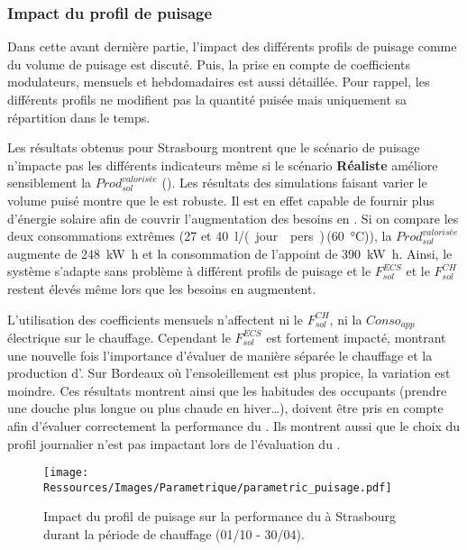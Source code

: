 \subsubsection{Impact du profil de puisage} %
\label{ssub:impact_du_profil_de_puisage}
Dans cette avant dernière partie, l’impact des différents profils de puisage comme du
volume de puisage est discuté. Puis, la prise en compte de coefficients modulateurs,
mensuels et hebdomadaires est aussi détaillée. Pour rappel, les différents profils ne
modifient pas la quantité puisée mais uniquement sa répartition dans le temps.

Les résultats obtenus pour Strasbourg montrent que le scénario de puisage n’impacte pas
les différents indicateurs même si le scénario \textbf{Réaliste} améliore sensiblement la
$Prod_{sol}^{valorisée}$ (). Les résultats des
simulations faisant varier le volume puisé montre que le  est robuste. Il est en
effet capable de fournir plus d’énergie solaire afin de couvrir l’augmentation des besoins
en . Si on compare les deux consommations extrêmes (\num{27} et
\SI{40}{\litre/(jour\period pers)}\,(\SI{60}{\celsius})), la $Prod_{sol}^{valorisée}$
augmente de \SI{248}{\kilo\watt\hour} et la consommation de l’appoint de \SI{390}{\kilo\watt\hour}.
Ainsi, le système s’adapte sans problème à différent profils de puisage et le
$F_{sol}^{ECS}$ et le $F_{sol}^{CH}$ restent élevés même lors que les besoins en  augmentent.

L’utilisation des coefficients mensuels n’affectent ni le $F_{sol}^{CH}$, ni la $Conso_{app}$
électrique sur le chauffage. Cependant le $F_{sol}^{ECS}$ est fortement impacté, montrant une
nouvelle fois l’importance d’évaluer de manière séparée le chauffage et la production
d’. Sur Bordeaux où l’ensoleillement est plus propice, la variation est moindre. Ces
résultats montrent ainsi que les habitudes des occupants (prendre une douche plus longue
ou plus chaude en hiver\dots), doivent être pris en compte afin d’évaluer correctement la
performance du . Ils montrent aussi que le choix du profil journalier n’est pas impactant lors
de l’évaluation du .

\begin{figure}
    \centering
    \texttt{[image: Ressources/Images/Parametrique/parametric\_puisage.pdf]}
    \caption[Impact du profil de puisage sur la performance du ]
            {Impact du profil de puisage sur la performance
             du  à Strasbourg durant la période de chauffage (01/10 - 30/04).}
    \label{fig:impact_profil_puisage}
\end{figure}


